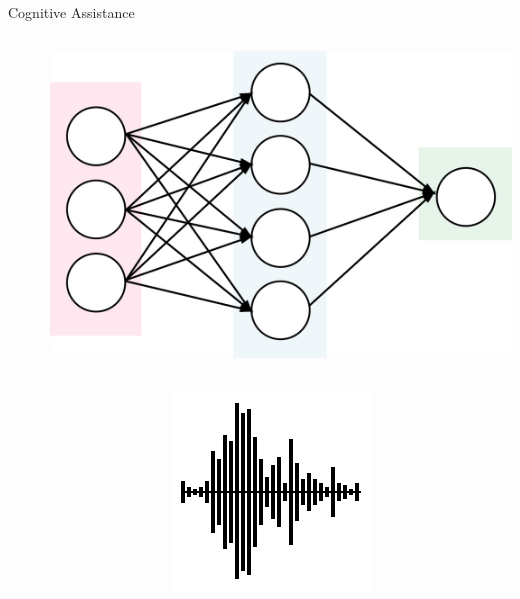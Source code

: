 \documentclass[aspectratio=1610]{beamer}
\begin{document}
\begin{frame}{Cognitive Assistance}
\begin{columns}[onlytextwidth]
\begin{column}{.25\linewidth}
        \end{column}
        \begin{column}{.5\linewidth}
            \centering
        \end{column}%
        \begin{column}{.25\linewidth}
            \centering%
            \includegraphics[width=\linewidth]{img/NN.png}\\
        \end{column}%
    \end{columns}%
    \begin{columns}[onlytextwidth]
        \begin{column}{.335\linewidth}%
        \end{column}%
        \begin{column}{.1\linewidth}
            \centering%
            \includegraphics[width=\linewidth]{img/sound_wave.png}

\end{column}
\end{columns}
\end{frame}
\end{document}
